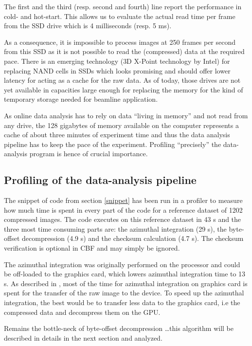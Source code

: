 \documentclass[preprint]{iucr}              %
\begin{document}
The first and the third (resp. second and fourth) line report the performance
in cold- and hot-start.
This allows us to evaluate the actual read time per frame from the SSD
drive which is 4 milliseconds (resp. 5 ms).

As a consequence, it is impossible to process images at 250 frames per
second from this SSD as it is not possible to read the (compressed) data
at the required pace.
There is an emerging technology (3D X-Point technology by Intel) for replacing
NAND cells in SSDs which looks promising and should offer
lower latency for acting as a cache for the raw data. 
As of today, those drives are not yet available in capacities large
enough for replacing the memory for the kind of temporary storage needed for
beamline application.

As online data analysis has to rely on data ``living in memory'' and not
read from any drive, the 128 gigabytes of memory available on the computer
represents a cache of about three minutes of experiment time and thus the data
analysis pipeline has to keep the pace of the experiment. 
Profiling ``precisely'' the data-analysis program is hence of crucial
importance.

\subsection{Profiling of the data-analysis pipeline}

The snippet of code from section \ref{snippet} has been run in a profiler to
measure how much time is spent in every part of the code for a reference
dataset of 1202 compressed images.
The code executes on this reference dataset in 43 s and the
three most time consuming parts are: the azimuthal integration (29 s), the
byte-offset decompression (4.9 s) and the checksum calculation (4.7 s).
The checksum verification is optional in CBF and may simply be ignored.

The azimuthal integration was originally performed on the processor and could be
off-loaded to the graphics card, which lowers azimuthal integration time to 13 s.
As described in \cite{kieffer_ashiotis-proc-euroscipy-2014}, most of the time
for azimuthal integration on graphics card is spent for the transfer of the raw image to the device.
To speed up the azimuthal integration, the best would be to transfer less data
to the graphics card, i.e the compressed data and decompress them on the GPU.

Remains the bottle-neck of byte-offset decompression \ldots this algorithm will
be described in details in the next section and analyzed. 
\end{document}
